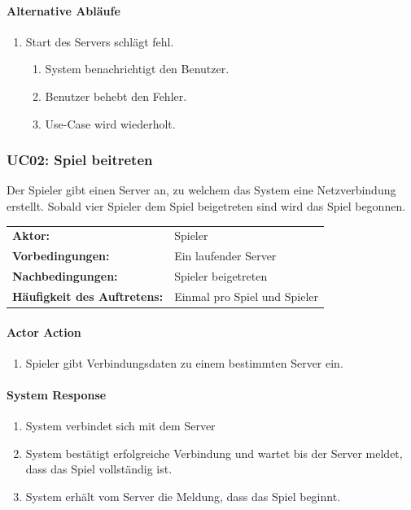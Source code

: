 \documentclass[a4paper,12pt,halfparskip,DIV14]{scrartcl}
\begin{document}
\paragraph{Alternative Abläufe}
\begin{enumerate}
	\item[2a] Start des Servers schlägt fehl.
	\begin{enumerate}
		\item System benachrichtigt den Benutzer.
		\item Benutzer behebt den Fehler.
		\item Use-Case wird wiederholt.
	\end{enumerate}
\end{enumerate}

\subsubsection{UC02: Spiel beitreten}\label{ssub:uc02_spiel_beitreten}
Der Spieler gibt einen Server an, zu welchem das System eine Netzverbindung erstellt. Sobald vier Spieler dem Spiel beigetreten sind wird das Spiel begonnen.

\begin{tabular}{@{} l l @{}}
	\textbf{Aktor:}											&	Spieler \\
	\textbf{Vorbedingungen:}						& Ein laufender Server \\
	\textbf{Nachbedingungen:}						& Spieler beigetreten \\
	\textbf{Häufigkeit des Auftretens:}	& Einmal pro Spiel und Spieler \\
\end{tabular}

\vspace{0.5cm}

\begin{multicols}{2}
\raggedcolumns
\paragraph{Actor Action}
\begin{enumerate}
	\item[1] Spieler gibt Verbindungsdaten zu einem bestimmten Server ein.
\end{enumerate}
\columnbreak
\paragraph{System Response}
\begin{enumerate}
	\item[2] System verbindet sich mit dem Server
	\item[3] System bestätigt erfolgreiche Verbindung und wartet bis der Server meldet, dass das Spiel vollständig ist.
	\item[4] System erhält vom Server die Meldung, dass das Spiel beginnt.
\end{enumerate}
\end{multicols}
\end{document}
